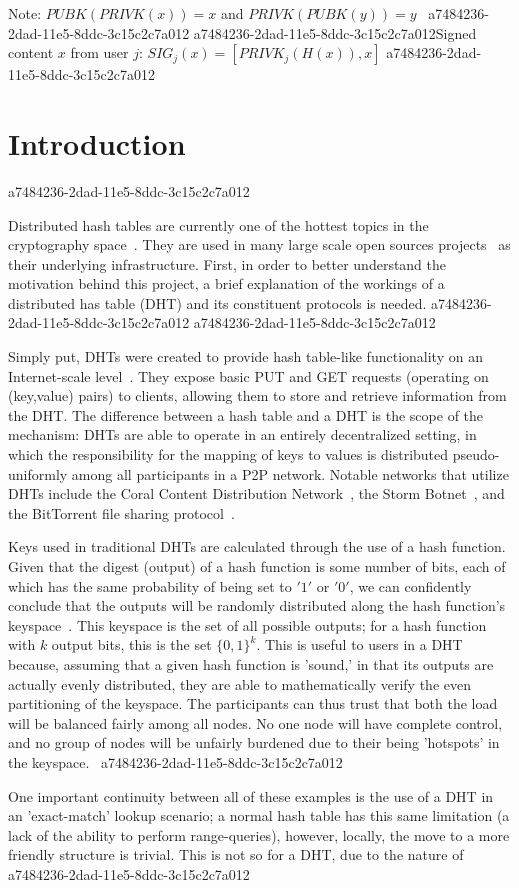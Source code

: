 \documentclass[12pt]{article}
\begin{document}
Note: $PUBK(PRIVK(x)) = x$ and $PRIVK(PUBK(y)) = y$~
a7484236-2dad-11e5-8ddc-3c15c2c7a012
a7484236-2dad-11e5-8ddc-3c15c2c7a012Signed content $x$ from user $j$: $SIG_j(x) = \left[ PRIVK_j( H(x) ), x \right]$
a7484236-2dad-11e5-8ddc-3c15c2c7a012
\section{Introduction}
a7484236-2dad-11e5-8ddc-3c15c2c7a012\par Distributed hash tables are currently one of the hottest topics in the cryptography space~\cite{Stoica:2001dj,Rowstron:2001ea,Ratnasamy:2001wn}. They are used in many large scale open sources projects~\cite{Freitas:2013tb,Xu:2010vs,Perfitt:2010fh} as their underlying infrastructure. First, in order to better understand the motivation behind this project, a brief explanation of the workings of a distributed has table (DHT) and its constituent protocols is needed.
a7484236-2dad-11e5-8ddc-3c15c2c7a012
a7484236-2dad-11e5-8ddc-3c15c2c7a012\par Simply put, DHTs were created to provide hash table-like functionality on an Internet-scale level~\cite{Ratnasamy:2001wn}. They expose basic PUT and GET requests (operating on (key,value) pairs) to clients, allowing them to store and retrieve information from the DHT. The difference between a hash table and a DHT is the scope of the mechanism: DHTs are able to operate in an entirely decentralized setting, in which the responsibility for the mapping of keys to values is distributed pseudo-uniformly among all participants in a P2P network. Notable networks that utilize DHTs include the Coral Content Distribution Network~\cite{Freedman:2004vb}, the Storm Botnet~\cite{Holz:2008uk}, and the BitTorrent file sharing protocol~\cite{Cohen:y1_8mBnw}.

\par Keys used in traditional DHTs are calculated through the use of a hash function. Given that the digest (output) of a hash function is some number of bits, each of which has the same probability of being set to $'1'$ or $'0'$, we can confidently conclude that the outputs will be randomly distributed along the hash function's keyspace~. This keyspace is the set of all possible outputs; for a hash function with $k$ output bits, this is the set $\{0,1\}^k$. This is useful to users in a DHT because, assuming that a given hash function is 'sound,' in that its outputs are actually evenly distributed, they are able to mathematically verify the even partitioning of the keyspace. The participants can thus trust that both the load will be balanced fairly among all nodes. No one node will have complete control, and no group of nodes will be unfairly burdened due to their being 'hotspots' in the keyspace.~
a7484236-2dad-11e5-8ddc-3c15c2c7a012
\par One important continuity between all of these examples is the use of a DHT in an 'exact-match' lookup scenario; a normal hash table has this same limitation (a lack of the ability to perform range-queries), however, locally, the move to a more friendly structure is trivial. This is not so for a DHT, due to the nature of
a7484236-2dad-11e5-8ddc-3c15c2c7a012\printbibliography
\end{document}
